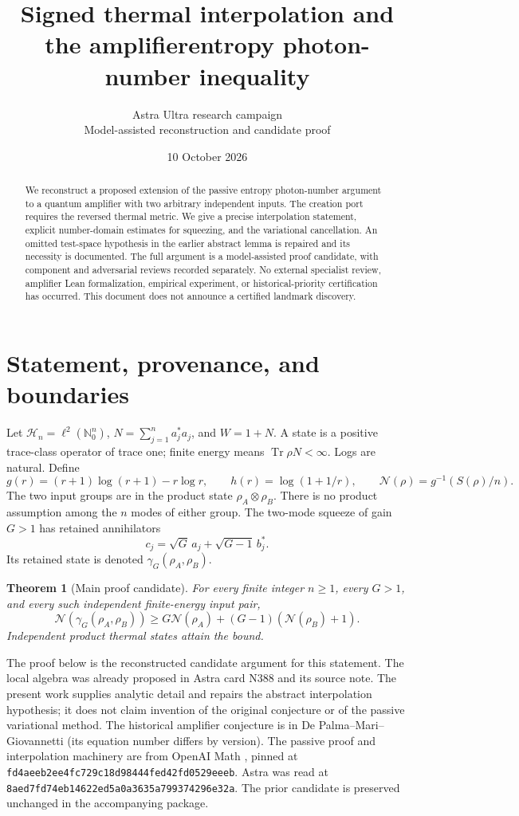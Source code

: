\documentclass[11pt]{article}
\title{Signed thermal interpolation and the amplifier\newline entropy photon-number inequality}
\author{Astra Ultra research campaign\\Model-assisted reconstruction and candidate proof}
\date{10 October 2026}
\newcommand{\Tr}{\operatorname{Tr}}
\newcommand{\N}{\mathbb N}
\newcommand{\Hh}{\mathcal H}
\newtheorem{theorem}{Theorem}
\theoremstyle{remark}\newtheorem{remark}[theorem]{Remark}
\begin{document}
\maketitle
\begin{abstract}
We reconstruct a proposed extension of the passive entropy photon-number
argument to a quantum amplifier with two arbitrary independent inputs.
The creation port requires the reversed thermal metric. We give a precise
interpolation statement, explicit number-domain estimates for squeezing,
and the variational cancellation. An omitted test-space hypothesis in the
earlier abstract lemma is repaired and its necessity is documented.
The full argument is a model-assisted proof candidate, with component and
adversarial reviews recorded separately. No external specialist review,
amplifier Lean formalization, empirical experiment, or historical-priority
certification has occurred. This document does not announce a certified
landmark discovery.
\end{abstract}

\section{Statement, provenance, and boundaries}
Let $\Hh_n=\ell^2(\N_0^n)$, $N=\sum_{j=1}^n a_j^*a_j$, and $W=1+N$.
A state is a positive trace-class operator of trace one; finite energy means
$\Tr\rho N<\infty$. Logs are natural. Define
\[
 g(r)=(r+1)\log(r+1)-r\log r,\qquad
 h(r)=\log(1+1/r),\qquad
 \mathcal N(\rho)=g^{-1}(S(\rho)/n).
\]
The two input groups are in the product state $\rho_A\otimes\rho_B$.
There is no product assumption among the $n$ modes of either group.
The two-mode squeeze of gain $G>1$ has retained annihilators
\[
 c_j=\sqrt G\,a_j+\sqrt{G-1}\,b_j^*.
\]
Its retained state is denoted $\gamma_G(\rho_A,\rho_B)$.

\begin{theorem}[Main proof candidate]\label{thm:main}
For every finite integer $n\ge1$, every $G>1$, and every such independent
finite-energy input pair,
\begin{equation}\label{eq:main}
 \mathcal N(\gamma_G(\rho_A,\rho_B))
 \ge G\mathcal N(\rho_A)+(G-1)(\mathcal N(\rho_B)+1).
\end{equation}
Independent product thermal states attain the bound.
\end{theorem}

The proof below is the reconstructed candidate argument for this statement.
The local algebra was already proposed in Astra card N388 and its source
note. The present work supplies analytic detail and repairs the abstract
interpolation hypothesis; it does not claim invention of the original
conjecture or of the passive variational method. The historical amplifier
conjecture is in De Palma--Mari--Giovannetti \cite{DMG} (its equation number
differs by version). The passive proof and interpolation machinery are
from OpenAI Math \cite{OAI}, pinned at
\texttt{fd4aeeb2ee4fc729c18d98444fed42fd0529eeeb}.
Astra was read at \texttt{8aed7fd74eb14622ed5a0a3635a799374296e32a}.
The prior candidate is preserved unchanged in the accompanying package.
\end{document}
